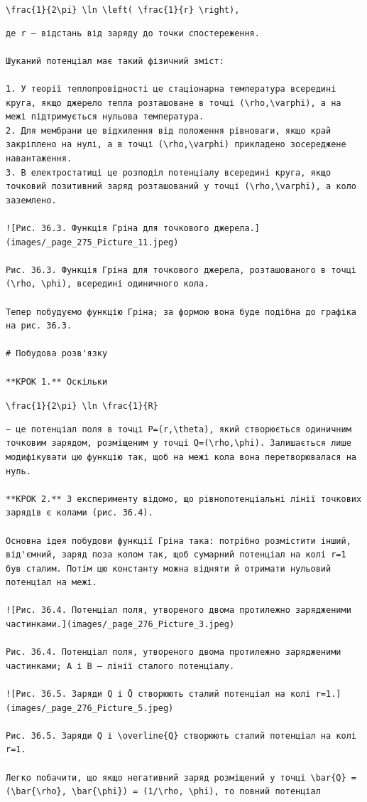 \documentclass[
  ukrainian,
]{article}
\begin{document}
\texttt{\textbackslash{}frac\{1\}\{2\textbackslash{}pi\}\ \textbackslash{}ln\ \textbackslash{}left(\ \textbackslash{}frac\{1\}\{r\}\ \textbackslash{}right),}

\begin{verbatim}
де r — відстань від заряду до точки спостереження.

Шуканий потенціал має такий фізичний зміст:

1. У теорії теплопровідності це стаціонарна температура всередині круга, якщо джерело тепла розташоване в точці (\rho,\varphi), а на межі підтримується нульова температура.
2. Для мембрани це відхилення від положення рівноваги, якщо край закріплено на нулі, а в точці (\rho,\varphi) прикладено зосереджене навантаження.
3. В електростатиці це розподіл потенціалу всередині круга, якщо точковий позитивний заряд розташований у точці (\rho,\varphi), а коло заземлено.

![Рис. 36.3. Функція Гріна для точкового джерела.](images/_page_275_Picture_11.jpeg)

Рис. 36.3. Функція Гріна для точкового джерела, розташованого в точці (\rho, \phi), всередині одиничного кола.

Тепер побудуємо функцію Гріна; за формою вона буде подібна до графіка на рис. 36.3.

# Побудова розв'язку

**КРОК 1.** Оскільки
\end{verbatim}

\texttt{\textbackslash{}frac\{1\}\{2\textbackslash{}pi\}\ \textbackslash{}ln\ \textbackslash{}frac\{1\}\{R\}}

\begin{verbatim}
— це потенціал поля в точці P=(r,\theta), який створюється одиничним точковим зарядом, розміщеним у точці Q=(\rho,\phi). Залишається лише модифікувати цю функцію так, щоб на межі кола вона перетворювалася на нуль.

**КРОК 2.** З експерименту відомо, що рівнопотенціальні лінії точкових зарядів є колами (рис. 36.4).

Основна ідея побудови функції Гріна така: потрібно розмістити інший, від'ємний, заряд поза колом так, щоб сумарний потенціал на колі r=1 був сталим. Потім цю константу можна відняти й отримати нульовий потенціал на межі.

![Рис. 36.4. Потенціал поля, утвореного двома протилежно зарядженими частинками.](images/_page_276_Picture_3.jpeg)

Рис. 36.4. Потенціал поля, утвореного двома протилежно зарядженими частинками; A і B — лінії сталого потенціалу.

![Рис. 36.5. Заряди Q і Q̄ створюють сталий потенціал на колі r=1.](images/_page_276_Picture_5.jpeg)

Рис. 36.5. Заряди Q і \overline{Q} створюють сталий потенціал на колі r=1.

Легко побачити, що якщо негативний заряд розміщений у точці \bar{Q} = (\bar{\rho}, \bar{\phi}) = (1/\rho, \phi), то повний потенціал
\end{verbatim}
\end{document}
